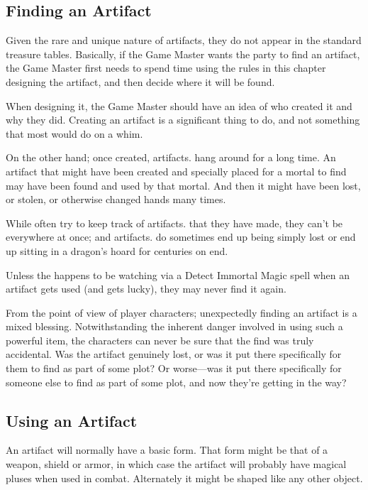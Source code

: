 \begin{multicols*}{2}
\subsection{Finding an Artifact}
Given the rare and unique nature of artifacts, they do not appear in the standard treasure tables. Basically, if the Game Master wants the party to find an artifact, the Game Master first needs to spend time using the rules in this chapter designing the artifact, and then decide where it will be found.

When designing it, the Game Master should have an idea of who created it and why they did. Creating an artifact is a significant thing to do, and not something that most  would do on a whim.

On the other hand; once created, artifacts. hang around for a long time. An artifact that might have been created and specially placed for a mortal to find may have been found and used by that mortal. And then it might have been lost, or stolen, or otherwise changed hands many times.

While  often try to keep track of artifacts. that they have made, they can’t be everywhere at once; and artifacts. do sometimes end up being simply lost or end up sitting in a dragon’s hoard for centuries on end.

Unless the  happens to be watching via a Detect Immortal Magic spell when an artifact gets used (and gets lucky), they may never find it again.

From the point of view of player characters; unexpectedly finding an artifact is a mixed blessing. Notwithstanding the inherent danger involved in using such a powerful item, the characters can never be sure that the find was truly accidental. Was the artifact genuinely lost, or was it put there specifically for them to find as part of some  plot? Or worse—was it put there specifically for someone else to find as part of some  plot, and now they’re getting in the way?

\subsection{Using an Artifact}
An artifact will normally have a basic form. That form might be that of a weapon, shield or armor, in which case the artifact will probably have magical pluses when used in combat. Alternately it might be shaped like any other object.


\end{multicols*}
